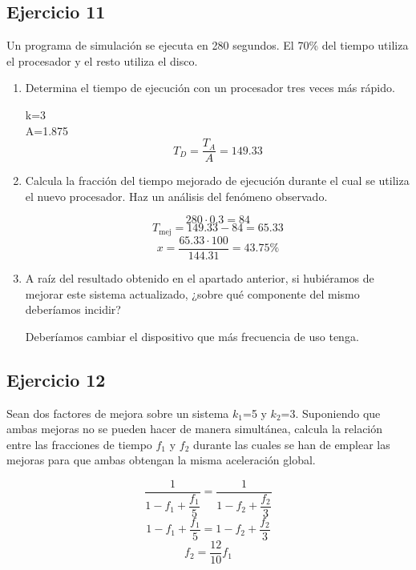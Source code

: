\subsection{Ejercicio 11}
\noindent
Un programa de simulación se ejecuta en 280 segundos. El 70\% del tiempo utiliza el procesador y el resto utiliza el disco.
\begin{enumerate}
    \item Determina el tiempo de ejecución con un procesador tres veces más rápido.
\begin{tcolorbox}[colback=white,colframe=cyan!50!black,fonttitle=\bfseries]
k=3\\
A=1.875
\[
T_D=\dfrac{T_A}{A}=149.33
\]
\end{tcolorbox}    
    \item Calcula la fracción del tiempo mejorado de ejecución durante el cual se utiliza el nuevo procesador. Haz un análisis del fenómeno observado.
\begin{tcolorbox}[colback=white,colframe=cyan!50!black,fonttitle=\bfseries]
\[
280\cdot 0.3=84
\]
\[
T_{\text{mej}}=149.33-84=65.33
\]
\[
x=\dfrac{65.33\cdot 100}{144.31}=43.75\%
\]
\end{tcolorbox}    
    \item A raíz del resultado obtenido en el apartado anterior, si hubiéramos de mejorar este sistema actualizado, ¿sobre qué componente del mismo deberíamos incidir?
\begin{tcolorbox}[colback=white,colframe=cyan!50!black,fonttitle=\bfseries]
Deberíamos cambiar el dispositivo que más frecuencia de uso tenga.
\end{tcolorbox}    
\end{enumerate}
\subsection{Ejercicio 12}
\noindent
Sean dos factores de mejora sobre un sistema $k_1$=5 y $k_2$=3. Suponiendo que ambas mejoras no se pueden hacer de manera simultánea, calcula la relación entre las fracciones de tiempo $f_1$ y $f_2$ durante las cuales se han de emplear las mejoras para que ambas obtengan la misma aceleración global.
\begin{tcolorbox}[colback=white,colframe=cyan!50!black,fonttitle=\bfseries]
\[
\dfrac{1}{1-f_1+\dfrac{f_1}{5}}=\dfrac{1}{1-f_2+\dfrac{f_2}{3}}
\]
\[
1-f_1+\dfrac{f_1}{5}=1-f_2+\dfrac{f_2}{3}
\]
\[
f_2=\dfrac{12}{10}f_1
\]
\end{tcolorbox}

